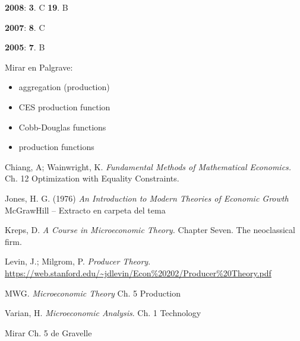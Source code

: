 \documentclass{nuevotema}
\begin{document}
\textbf{2008}: \textbf{3}. C \textbf{19}. B

\textbf{2007}: \textbf{8}. C

\textbf{2005}: \textbf{7}. B


\bibliografia


Mirar en Palgrave:

\begin{itemize}
	\item aggregation (production)
	\item CES production function
	\item Cobb-Douglas functions
	\item production functions
\end{itemize}

Chiang, A; Wainwright, K. \textit{Fundamental Methods of Mathematical Economics.} Ch. 12 Optimization with Equality Constraints.



Jones, H. G. (1976) \textit{An Introduction to Modern Theories of Economic Growth} McGrawHill -- Extracto en carpeta del tema

Kreps, D. \textit{A Course in Microeconomic Theory.} Chapter Seven. The neoclassical firm.

Levin, J.; Milgrom, P. \textit{Producer Theory}. \url{https://web.stanford.edu/~jdlevin/Econ%20202/Producer%20Theory.pdf}
	
MWG. \textit{Microeconomic Theory} Ch. 5 Production
	
Varian, H. \textit{Microeconomic Analysis}. Ch. 1 Technology

Mirar Ch. 5 de Gravelle
\end{document}
